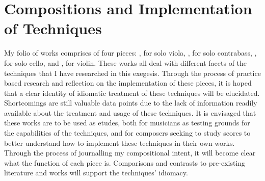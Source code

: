 
\chapter{Compositions and Implementation of Techniques}




My folio of works comprises of four pieces: , for solo viola, , for solo contrabass, , for solo cello, and , for violin. 
These works all deal with different facets of the techniques that I have researched in this exegesis. 
Through the process of practice based research and reflection on the implementation of these pieces, it is hoped that a clear identity of idiomatic treatment of these techniques will be elucidated.
Shortcomings are still valuable data points due to the lack of information readily available about the treatment and usage of these techniques.
It is envisaged that these works are to be used as etudes, both for musicians as testing grounds for the capabilities of the techniques, and for composers seeking to study scores to better understand how to implement these techniques in their own works.
Through the process of journalling my compositional intent, it will become clear what the function of each piece is.
Comparisons and contrasts to pre-existing literature and works will support the techniques' idiomacy. 

